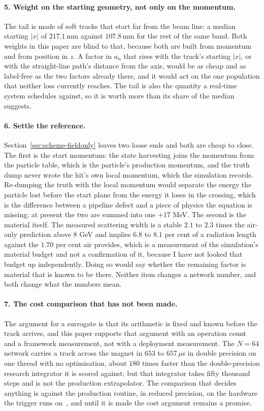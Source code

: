 \documentclass[11pt,a4paper]{article}
\newcommand{\mm}{\ensuremath{\,\mathrm{mm}}}
\begin{document}
\paragraph{5. Weight on the starting geometry, not only on the momentum.} The
tail is made of soft tracks that start far from the beam line: a median
starting $|x|$ of $217.1\mm$ against $107.8\mm$ for the rest of the same band.
Both weights in this paper are blind to that, because both are built from
momentum and from position in $z$. A factor in $a_n$ that rises with the
track's starting $|x|$, or with the straight-line path's distance from the axis,
would be as cheap and as label-free as the two factors already there, and it
would act on the one population that neither loss currently reaches. The tail
is also the quantity a real-time system schedules against, so it is worth more
than its share of the median suggests.

\paragraph{6. Settle the reference.} Section~\ref{sec:scheme-fieldonly} leaves
two loose ends and both are cheap to close. The first is the start momentum:
the state harvesting joins the momentum from the particle table, which is the
particle's production momentum, and the truth dump never wrote the hit's own
local momentum, which the simulation records. Re-dumping the truth with the
local momentum would separate the energy the particle lost before the start
plane from the energy it loses in the crossing, which is the difference between
a pipeline defect and a piece of physics the equation is missing; at present the
two are summed into one $+17$ MeV. The second is the material itself. The
measured scattering width is a stable $2.1$ to $2.3$ times the air-only
prediction above $8$ GeV and implies $6.8$ to $8.1$ per cent of a radiation
length against the $1.70$ per cent air provides, which is a measurement of the
simulation's material budget and not a confirmation of it, because I have not
looked that budget up independently. Doing so would say whether the remaining
factor is material that is known to be there. Neither item changes a network
number, and both change what the numbers mean.

\paragraph{7. The cost comparison that has not been made.} The argument for a
surrogate is that its arithmetic is fixed and known before the track arrives,
and this paper supports that argument with an operation count and a framework
measurement, not with a deployment measurement. The $N = 64$ network carries a
track across the magnet in $653$ to $657\,\mu$s in double precision on one
thread with no optimisation, about $180$ times faster than the double-precision
research integrator it is scored against; but that integrator takes fifty
thousand steps and is not the production extrapolator. The comparison that
decides anything is against the production routine, in reduced precision, on
the hardware the trigger runs on~\citep{aaij2020}, and until it is made the cost
argument remains a promise.
\end{document}
